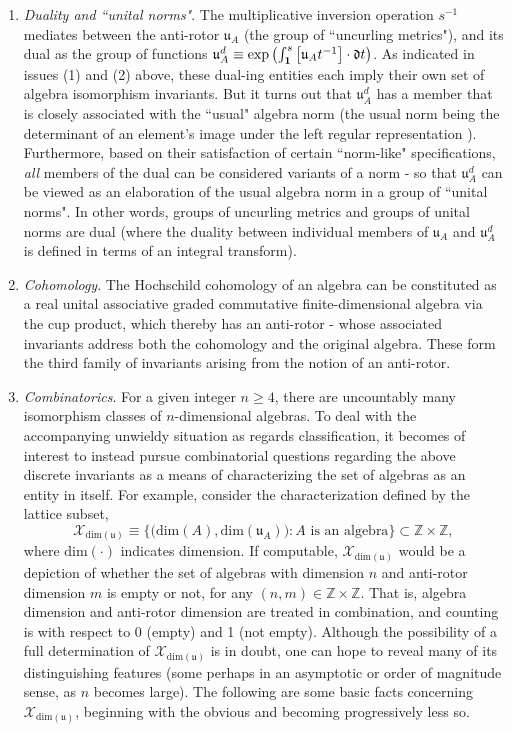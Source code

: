 \documentclass{amsart}
\numberwithin{equation}{section}
\theoremstyle{definition}
\numberwithin{theorem}{section}
\begin{document}
\begin{enumerate}
\item {\it Duality and ``unital norms"}. The multiplicative inversion operation $s^{-1}$ mediates between the anti-rotor $\mathfrak{u}_A$ (the group of ``uncurling metrics"), and its dual as the group of functions $\mathfrak{u}_A^d \equiv \text{exp}\left(\int_{{\bf 1}}^{s} \left[\mathfrak{u}_At^{-1}\right]\cdot \mathfrak{d}t\right)$.  As indicated in issues (1) and (2) above, these dual-ing entities each imply their own set of algebra isomorphism invariants.  But it turns out that $\mathfrak{u}_A^d$ has a member that is closely associated with the ``usual" algebra norm (the usual norm being the determinant of an element's image under the left regular representation \cite{bourbaki:1989}).   Furthermore, based on their satisfaction of certain ``norm-like" specifications, {\it all} members of the dual can be considered variants of a norm - so that $\mathfrak{u}_A^d$ can be viewed as an elaboration of the usual algebra norm in a group of ``unital norms".  In other words, groups of uncurling metrics and groups of unital norms are dual (where the duality between individual members of  $\mathfrak{u}_A$ and $\mathfrak{u}_A^d$ is defined in terms of an integral transform).
\item {\it Cohomology}. The Hochschild cohomology of an algebra can be constituted as a real unital associative graded commutative finite-dimensional algebra via the cup product, which thereby has an anti-rotor - whose associated invariants address both the cohomology and the original algebra.  These form the third family of invariants arising from the notion of an anti-rotor.
  \item {\it Combinatorics}. For a given integer $n\ge 4$, there are uncountably many isomorphism classes of $n$-dimensional algebras.  To deal with the accompanying unwieldy situation as regards classification, it becomes of interest to instead pursue combinatorial questions regarding the above discrete invariants as a means of characterizing the set of algebras as an entity in itself.   For example, consider the characterization defined by the lattice subset, \[ \mathcal{X}_{\text{dim}(\mathfrak{u})} \equiv \big\{\big(\text{dim}(A),\text{dim}(\mathfrak{u}_A)\big): A \text{ is an algebra}\big\} \subset \mathbb{Z}\times\mathbb{Z},\] where $\text{dim}(\cdot)$ indicates dimension.  If computable, $\mathcal{X}_{\text{dim}(\mathfrak{u})}$ would be a depiction of whether the set of algebras with dimension $n$ and anti-rotor dimension $m$ is empty or not, for any $(n,m)\in \mathbb{Z}\times\mathbb{Z}$.  That is, algebra dimension and anti-rotor dimension are treated in combination, and counting is with respect to 0 (empty) and 1 (not empty). Although the possibility of a full determination of $\mathcal{X}_{\text{dim}(\mathfrak{u})}$ is in doubt, one can hope to reveal many of its distinguishing features (some perhaps in an  asymptotic or order of magnitude sense, as $n$ becomes large). The following are some basic facts concerning $\mathcal{X}_{\text{dim}(\mathfrak{u})}$, beginning with the obvious and becoming progressively less so.




\end{enumerate}
\end{document}
